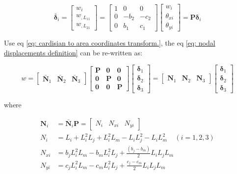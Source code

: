 \begin{equation}\label{eq: cardisian to area coordinates transform.}
\bar{\mathbf{\delta}}_i = \begin{bmatrix}
w_i \\ 
w_{,L_{11}} \\ 
w_{,L_{21}}
\end{bmatrix} = \begin{bmatrix}
1 & 0 & 0 \\ 
0 & -b_2 & -c_2 \\ 
0 & b_1 & c_1
\end{bmatrix} \begin{bmatrix}
w_i \\ 
\theta_{xi} \\ 
\theta_{yi}
\end{bmatrix} = \mathbf{P} \mathbf{\delta}_i
\end{equation}

Use eq \ref{eq: cardisian to area coordinates transform.}, the eq \ref{eq: nodal displacements definition} can be re-written as:

\begin{equation}\label{key}
w = \begin{bmatrix}
\bar{\mathbf{N}}_1 & \bar{\mathbf{N}}_2 & \bar{\mathbf{N}}_3
\end{bmatrix} \begin{bmatrix}
\mathbf{P} & \mathbf{0} & \mathbf{0} \\ 
\mathbf{0} & \mathbf{P} & \mathbf{0} \\ 
\mathbf{0} & \mathbf{0} & \mathbf{P}
\end{bmatrix} \begin{bmatrix}
\mathbf{\delta}_1 \\ 
\mathbf{\delta}_2 \\ 
\mathbf{\delta}_3
\end{bmatrix} = \begin{bmatrix}
\mathbf{N}_1 & \mathbf{N}_2 & \mathbf{N}_3
\end{bmatrix} \begin{bmatrix}
\mathbf{\delta}_1 \\ 
\mathbf{\delta}_2 \\ 
\mathbf{\delta}_3
\end{bmatrix}
\end{equation}

where

\begin{align*}\label{eq: shape function in area coordinates for bending plate}
\mathbf{N}_i &= \bar{\mathbf{N}}_i \mathbf{P} = \begin{bmatrix}
N_i & N_{xi} & N_{yi}
\end{bmatrix}\\
N_i &= L_i + L_i^2 L_j + L_i^2 L_m - L_i L_j^2 - L_i L_m^2  ~~~~~(i=1,2,3) \\
N_{xi} &= b_j L_i^2 L_m - b_m L_i^2 L_j + \frac{(b_j-b_m)}{2}L_i L_j L_m \\
N_{yi} &= c_j L_i^2 L_m - c_m L_i^2 L_j + \frac{c_j - c_m}{2} L_i L_j L_m
\end{align*}

